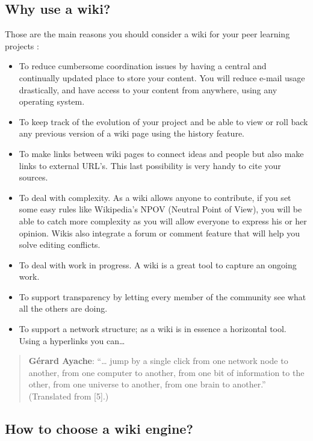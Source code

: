 \subsection{Why use a wiki?}\label{why-use-a-wiki}

Those are the main reasons you should consider a wiki for your peer
learning projects :

\begin{itemize}
\itemsep1pt\parskip0pt
\item
  To reduce cumbersome coordination issues by having a central and
  continually updated place to store your content. You will reduce
  e-mail usage drastically, and have access to your content from
  anywhere, using any operating system.
\item
  To keep track of the evolution of your project and be able to view or
  roll back any previous version of a wiki page using the history
  feature.
\item
  To make links between wiki pages to connect ideas and people but also
  make links to external URL's. This last possibility is very handy to
  cite your sources.
\item
  To deal with complexity. As a wiki allows anyone to contribute, if you
  set some easy rules like Wikipedia's NPOV (Neutral Point of View), you
  will be able to catch more complexity as you will allow everyone to
  express his or her opinion. Wikis also integrate a forum or comment
  feature that will help you solve editing conflicts.
\item
  To deal with work in progress. A wiki is a great tool to capture an
  ongoing work.
\item
  To support transparency by letting every member of the community see
  what all the others are doing.
\item
  To support a network structure; as a wiki is in essence a horizontal
  tool. Using a hyperlinks you can\ldots{}
\end{itemize}

\begin{quote}
\textbf{Gérard Ayache}: ``\ldots{} jump by a single click from one
network node to another, from one computer to another, from one bit of
information to the other, from one universe to another, from one brain
to another.''~ (Translated from {{[}5{]}}.)
\end{quote}

\subsection{How to choose a wiki
engine?}\label{how-to-choose-a-wiki-engine}

